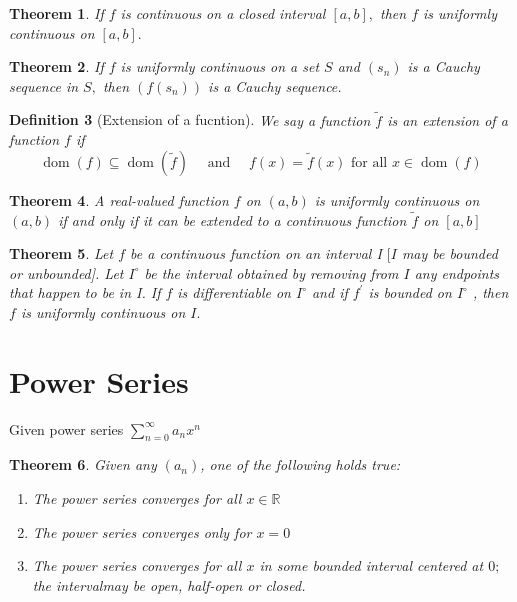 \documentclass[12pt]{article}
\newtheorem{theorem}{Theorem}[section]
\newtheorem{definition}[theorem]{Definition}
\begin{document}
\begin{theorem}
	If $f$ is continuous on a closed interval $[ a , b ] ,$ then $f$ is uniformly
	continuous on $[ a , b ] .$
\end{theorem}

\begin{theorem}
	If $f$ is uniformly continuous on a set $S$ and $\left( s _ { n } \right)$ is a Cauchy sequence
	in $S ,$ then $\left( f \left( s _ { n } \right) \right)$ is a Cauchy sequence.
\end{theorem}
\begin{definition}[Extension of a fucntion]
	We say a function $\tilde { f }$ is an extension of a function $f$ if $$
	\operatorname { dom } ( f ) \subseteq \operatorname { dom } ( \tilde { f } ) \quad \text { and } \quad f ( x ) = \tilde { f } ( x ) \text { for all } x \in \operatorname { dom } ( f )
	$$
\end{definition}
\begin{theorem}
	A real-valued function $f$ on $( a , b )$ is uniformly continuous on $( a , b )$
	if and only if it can be extended to a continuous function $\tilde { f }$ on $[ a , b ]$
\end{theorem}

\begin{theorem}
	Let $f$ be a continuous function on an interval I $[ I$ may be bounded
	or unbounded]. Let $I ^ { \circ }$ be the interval obtained by removing from $I$ any endpoints that happen to be in I. If $f$ is differentiable on $I ^ { \circ }$ and
	if $f ^ { \prime }$ is bounded on $I ^ { \circ }$ , then $f$ is uniformly continuous on $I .$
\end{theorem}

\section{Power Series}
Given power series $\sum _ { n = 0 } ^ { \infty } a _ { n } x ^ { n }$
\begin{theorem}
Given any $(a_n)$, one of the following holds true:
\begin{enumerate}
	\item The power series converges for all $x \in \mathbb{R}$
	\item The power series converges only for $x = 0$
	\item The power series converges for all $x$ in some bounded interval centered at $0 ;$ the intervalmay be open, half-open or closed.
\end{enumerate}
\end{theorem}
\end{document}
